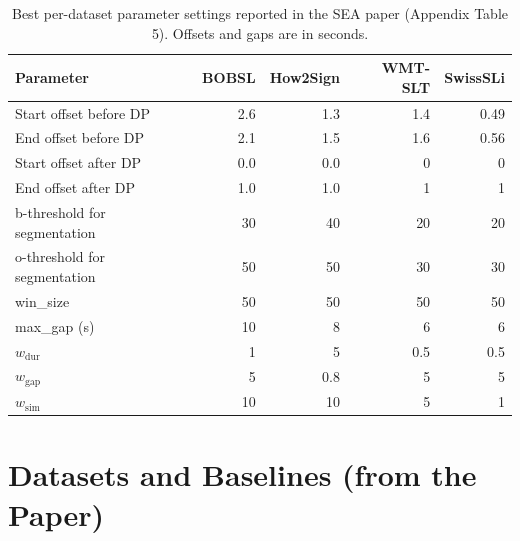 \documentclass[11pt,a4paper]{article}
\def\texttt#1{#1}%
\def\textbf#1{#1}%
\begin{document}
\begin{table}[h]
\centering
\small
\begin{tabular}{lrrrr}
\toprule
\textbf{Parameter} & \textbf{BOBSL} & \textbf{How2Sign} & \textbf{WMT-SLT} & \textbf{SwissSLi} \\
\midrule
Start offset before DP                & 2.6  & 1.3  & 1.4  & 0.49 \\
End offset before DP                  & 2.1  & 1.5  & 1.6  & 0.56 \\
Start offset after DP                 & 0.0  & 0.0  & 0    & 0    \\
End offset after DP                   & 1.0  & 1.0  & 1    & 1    \\
\texttt{b-threshold} for segmentation & 30   & 40   & 20   & 20   \\
\texttt{o-threshold} for segmentation & 50   & 50   & 30   & 30   \\
\texttt{win\_size}                    & 50   & 50   & 50   & 50   \\
\texttt{max\_gap} (s)                 & 10   & 8    & 6    & 6    \\
$w_{\mathrm{dur}}$                    & 1    & 5    & 0.5  & 0.5  \\
$w_{\mathrm{gap}}$                    & 5    & 0.8  & 5    & 5    \\
$w_{\mathrm{sim}}$                    & 10   & 10   & 5    & 1    \\
\bottomrule
\end{tabular}
\caption{Best per-dataset parameter settings reported in the SEA paper
(Appendix Table 5). Offsets and gaps are in seconds.}
\label{tab:paper-params}
\end{table}


\section{Datasets and Baselines (from the Paper)}
\label{sec:paper-data}
\end{document}
